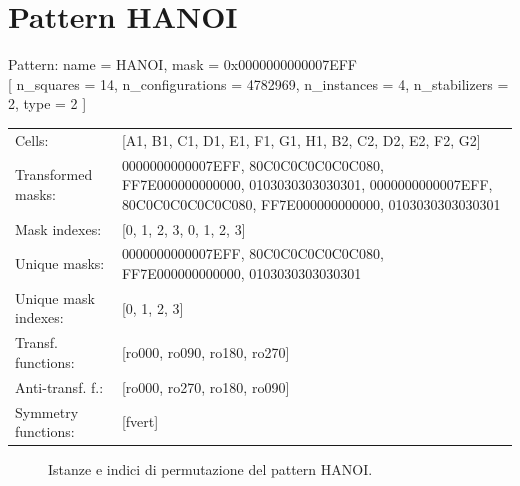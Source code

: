 \newpage

\section{Pattern HANOI}

\begin{tcolorbox}[sharp corners, fontupper=\ttfamily\small, colback=white]
  \noindent Pattern: name = HANOI, mask = 0x0000000000007EFF\\
  {[} n\_squares = 14, n\_configurations = 4782969,
  n\_instances = 4, n\_stabilizers = 2, type = 2 { ]}\\[1.0ex]
  \begin{tabularx}{\textwidth}{@{} p{3.5cm} X @{}}
    Cells:               & {[}A1, B1, C1, D1, E1, F1, G1, H1, B2, C2, D2, E2, F2, G2{]}\\[0.5ex]
    Transformed masks:   & 0000000000007EFF, 80C0C0C0C0C0C080, FF7E000000000000, 0103030303030301, 0000000000007EFF, 80C0C0C0C0C0C080, FF7E000000000000, 0103030303030301\\[0.5ex]
    Mask indexes:        & {[}0, 1, 2, 3, 0, 1, 2, 3{]}\\[0.5ex]
    Unique masks:        & 0000000000007EFF, 80C0C0C0C0C0C080, FF7E000000000000, 0103030303030301\\[0.5ex]
    Unique mask indexes: & {[}0, 1, 2, 3{]}\\[0.5ex]
    Transf. functions:   & {[}ro000, ro090, ro180, ro270{]}\\[0.5ex]
    Anti-transf. f.:     & {[}ro000, ro270, ro180, ro090{]}\\[0.5ex]
    Symmetry functions:  & {[}fvert{]}\\[0.5ex]
  \end{tabularx}
\end{tcolorbox}

\begin{figure}[htbp]
  \centering
   \hfill
   \hfill
   \hfill
  \vspace{0.3cm}
   \hfill
   \hfill
   \hfill
  \caption{Istanze e indici di permutazione del pattern HANOI.}
\end{figure}

